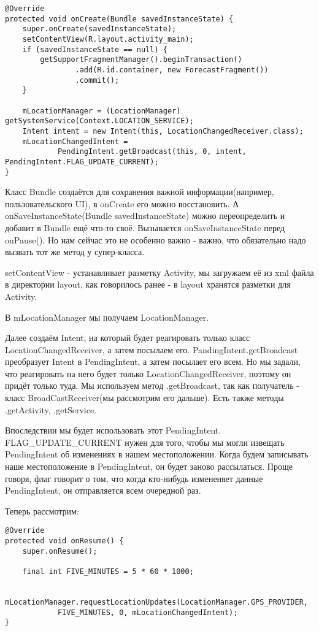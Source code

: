 \documentclass[12 pt]{article}
\begin{document}
    \begin{lstlisting}
@Override
protected void onCreate(Bundle savedInstanceState) {
    super.onCreate(savedInstanceState);
    setContentView(R.layout.activity_main);
    if (savedInstanceState == null) {
        getSupportFragmentManager().beginTransaction()
                .add(R.id.container, new ForecastFragment())
                .commit();
    }

    mLocationManager = (LocationManager) getSystemService(Context.LOCATION_SERVICE);
    Intent intent = new Intent(this, LocationChangedReceiver.class);
    mLocationChangedIntent =
            PendingIntent.getBroadcast(this, 0, intent, PendingIntent.FLAG_UPDATE_CURRENT);
}   
    \end{lstlisting}  
    
    Класс Bundle создаётся для сохранения важной информации(например, пользовательского UI), в onCreate его можно восстановить. А onSaveInstanceState(Bundle savedInstanceState) можно переопределить и добавит в Bundle ещё что-то своё. Вызывается onSaveInstanceState перед onPause(). Но нам сейчас это не особенно важно - важно, что обязательно надо вызвать тот же метод у супер-класса.
    
     setContentView - устанавливает разметку Activity, мы загружаем её из xml файла в директории layout, как говорилось ранее - в layout хранятся разметки для Activity.
     
     В mLocationManager мы получаем LocationManager.
     
     Далее создаём Intent, на который будет реагировать только класс LocationChangedReceiver, а затем посылаем его. PandingIntent.getBroadcast преобразует Intent в PendingIntent, а затем посылает его всем. Но мы задали, что реагировать на него будет только LocationChangedReceiver, поэтому он придёт только туда. Мы используем метод .getBroadcast, так как получатель - класс BroadCastReceiver(мы рассмотрим его дальше). Есть также методы .getActivity, .getService. 
     
     Впоследствии мы будет использовать этот PendingIntent. FLAG\_UPDATE\_CURRENT нужен для того, чтобы мы могли извещать PendingIntent об изменениях в нашем местоположении. Когда будем записывать наше местоположение в PendingIntent, он будет заново рассылаться. Проще говоря, флаг говорит о том, что когда кто-нибудь измененяет данные PendingIntent, он отправляется всем очередной раз.
     
     Теперь рассмотрим:
     
     \begin{lstlisting}
@Override
protected void onResume() {
    super.onResume();

    final int FIVE_MINUTES = 5 * 60 * 1000;

    mLocationManager.requestLocationUpdates(LocationManager.GPS_PROVIDER,
            FIVE_MINUTES, 0, mLocationChangedIntent);
}    
     \end{lstlisting}
    
\end{document}
